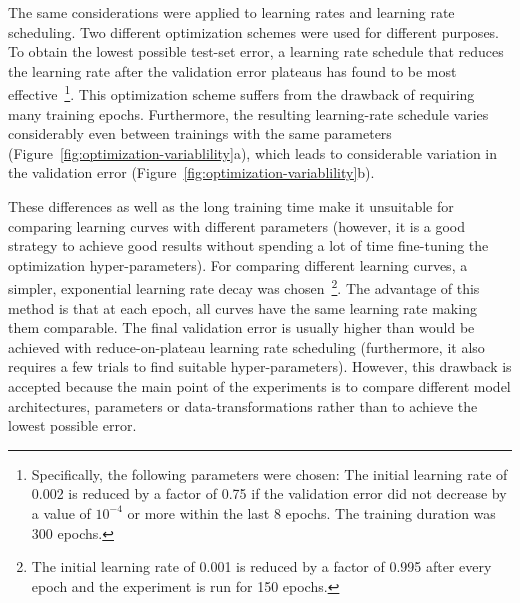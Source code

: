 The same considerations were applied to learning rates and learning rate scheduling. Two different optimization schemes were used for different purposes.
To obtain the lowest possible test-set error, a learning rate schedule that reduces the learning rate after the validation error plateaus has found to be most effective~\footnote{\label{fn:reduce-on-plateu}
	Specifically, the following parameters were chosen: The initial learning rate of 0.002 is reduced by a factor of 0.75 if the validation error did not decrease by a value of $10^{-4}$ or more within the last 8 epochs. The training duration was 300 epochs.
}. This optimization scheme suffers from the drawback of requiring many training epochs. Furthermore, the resulting learning-rate schedule varies considerably even between trainings with the same parameters (Figure~\ref{fig:optimization-variablility}a), which leads to considerable variation in the validation error (Figure~\ref{fig:optimization-variablility}b).

These differences as well as the long training time make it unsuitable for comparing learning curves with different parameters (however, it is a good strategy to achieve good results without spending a lot of time fine-tuning the optimization hyper-parameters).
For comparing different learning curves, a simpler, exponential learning rate decay was chosen~\footnote{
	The initial learning rate of 0.001 is reduced by a factor of 0.995 after every epoch and the experiment is run for 150 epochs.
}. The advantage of this method is that at each epoch, all curves have the same learning rate making them comparable. The final validation error is usually higher than would be achieved with reduce-on-plateau learning rate scheduling (furthermore, it also requires a few trials to find suitable hyper-parameters). However, this drawback is accepted because the main point of the experiments is to compare different model architectures, parameters or data-transformations rather than to achieve the lowest possible error.



